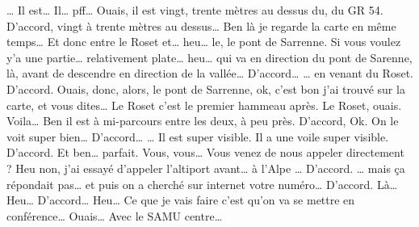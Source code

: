 \begin{dialogue}
  \Req … Il est… Il… pff… Ouais, il est vingt, trente mètres au dessus du, du GR 54.
  \Sec D'accord, vingt à trente mètres au dessus… Ben là je regarde la carte en même temps…
  \Req Et donc entre le Roset et… heu… le, le pont de Sarrenne. Si vous voulez y'a une partie… relativement plate… heu… qui va en direction du pont de Sarenne, là, avant de descendre en direction de la vallée…
  \Sec D'accord…
  \Req … en venant du Roset.
  \Sec D'accord. Ouais, donc, alors, le pont de Sarrenne, ok, c'est bon j'ai trouvé sur la carte, et vous dites…
  \Req Le Roset c'est le premier hammeau après.
  \Sec Le Roset, ouais.
  \Req Voila… Ben il est à mi-parcours entre les deux, à peu près.
  \Sec D'accord, Ok.
  \Req On le voit super bien…
  \Sec D'accord…
  \Req … Il est super visible. Il a une voile super visible.
  \Sec D'accord. Et ben… parfait. Vous, vous… Vous venez de nous appeler directement ?
  \Req Heu non, j'ai essayé d'appeler l'altiport avant… à l'Alpe … 
  \Sec D'accord.
  \Req … mais ça répondait pas… et puis on a cherché sur internet votre numéro…
  \Sec D'accord. Là… Heu… D'accord… Heu… Ce que je vais faire c'est qu'on va se mettre en conférence…
  \Req Ouais…
  \Sec Avec le SAMU centre… 
\end{dialogue}
